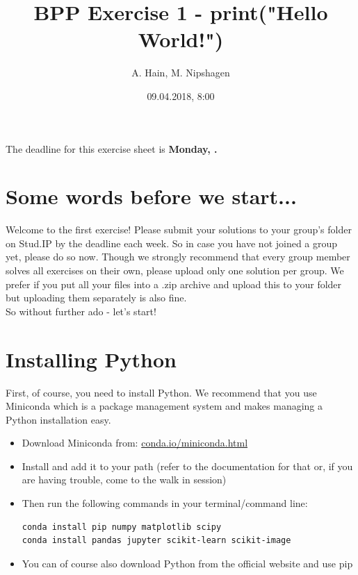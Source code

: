 \documentclass{article}
\title{BPP Exercise 1 - print("Hello World!")}
\author{A. Hain, M. Nipshagen}
\date{09.04.2018, 8:00}
\makeatletter
\let\thedate\@date
\makeatother
\begin{document}
The deadline for this exercise sheet is \textbf{Monday, \thedate.}

\section*{Some words before we start...}
Welcome to the first exercise! Please submit your solutions to your group's folder
on Stud.IP by the deadline each week. So in case you have not joined a group yet,
please do so now. Though we strongly recommend that every group member solves all
exercises on their own, please upload only one solution per group. We prefer if
you put all your files into a .zip archive and upload this to your folder but
uploading them separately is also fine.\\
So without further ado - let's start!

\section{Installing Python}
First, of course, you need to install Python. We recommend that you use Miniconda
which is a package management system and makes managing a Python installation easy.

\begin{itemize}
\item Download Miniconda from: \href{conda.io/miniconda.html​}{conda.io/miniconda.html}
\item Install and add it to your path (refer to the documentation for that or, if you are having trouble,
come to the walk in session)
\item Then run the following commands in your terminal/command line:
\begin{lstlisting}
conda install pip numpy matplotlib scipy
conda install pandas jupyter scikit-learn scikit-image
\end{lstlisting}
\item You can of course also download Python from the official website and use pip
\end{itemize}


\end{document}
